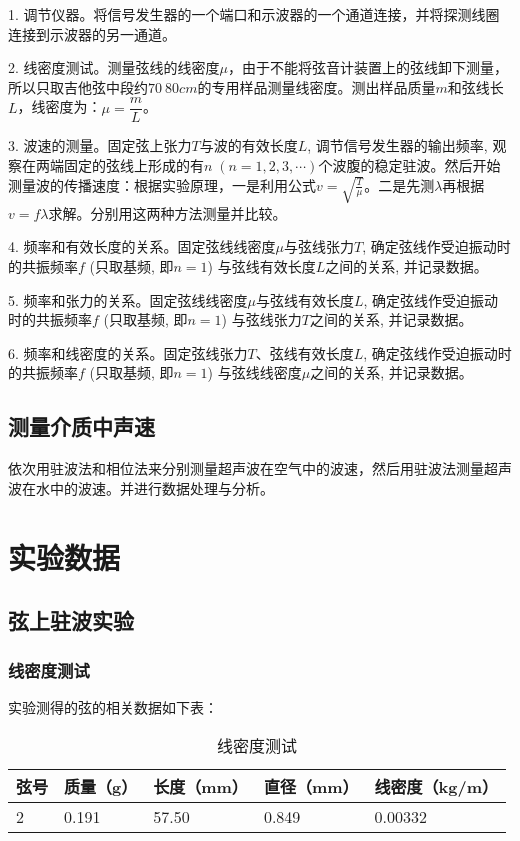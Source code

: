 \documentclass[11pt]{article}
\begin{document}
1. 调节仪器。将信号发生器的一个端口和示波器的一个通道连接，并将探测线圈连接到示波器的另一通道。

2. 线密度测试。测量弦线的线密度$\mu$，由于不能将弦音计装置上的弦线卸下测量，所以只取吉他弦中段约$70~80cm$的专用样品测量线密度。测出样品质量$m$和弦线长$L$，线密度为：$\mu=\dfrac{m}{L}$。

3. 波速的测量。固定弦上张力$T$与波的有效长度$L$, 调节信号发生器的输出频率, 观察在两端固定的弦线上形成的有$n\; (n=1,2,3,\cdots)$个波腹的稳定驻波。然后开始测量波的传播速度：根据实验原理，一是利用公式$\displaystyle v=\sqrt{\frac{T}{\mu}}$。二是先测$\lambda$再根据$v=f\lambda$求解。分别用这两种方法测量并比较。

4. 频率和有效长度的关系。固定弦线线密度$\mu$与弦线张力$T$, 确定弦线作受迫振动时的共振频率$f$ (只取基频, 即$n=1$) 与弦线有效长度$L$之间的关系, 并记录数据。

5. 频率和张力的关系。固定弦线线密度$\mu$与弦线有效长度$L$, 确定弦线作受迫振动时的共振频率$f$ (只取基频, 即$n=1$) 与弦线张力$T$之间的关系, 并记录数据。

6. 频率和线密度的关系。固定弦线张力$T$、弦线有效长度$L$, 确定弦线作受迫振动时的共振频率$f$ (只取基频, 即$n=1$) 与弦线线密度$\mu$之间的关系, 并记录数据。

\subsection{测量介质中声速}

依次用驻波法和相位法来分别测量超声波在空气中的波速，然后用驻波法测量超声波在水中的波速。并进行数据处理与分析。

\section{实验数据}

\subsection{弦上驻波实验}

\subsubsection{线密度测试}

实验测得的弦的相关数据如下表：

\begin{table}[!ht]
    \centering
    \begin{tabular}{|l|l|l|l|l|}
    \hline
        弦号 & 质量（g） & 长度（mm） & 直径（mm） & 线密度（kg/m） \\ \hline
        2 & 0.191 & 57.50 & 0.849 & 0.00332 \\ \hline
    \end{tabular}
\caption{线密度测试}
\end{table}
\end{document}
